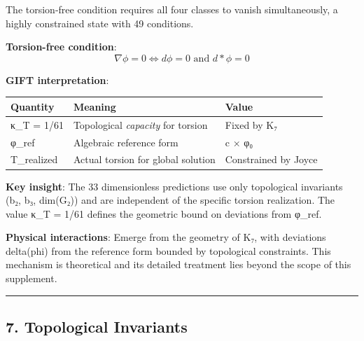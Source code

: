\documentclass[11pt,a4paper]{article}
\begin{document}
{{{{{{{{{{{{The torsion-free condition requires all four classes to vanish simultaneously, a highly constrained state with 49 conditions.

\textbf{Torsion-free condition}:
\[\nabla\phi = 0 \Leftrightarrow d\phi = 0 \text{ and } d*\phi = 0\]

\textbf{GIFT interpretation}:

{\def\LTcaptype{none} %
\begin{longtable}[]{@{}
  >{\raggedright\arraybackslash}p{}
  >{\raggedright\arraybackslash}p{}
  >{\raggedright\arraybackslash}p{}@{}}
\toprule\noalign{}
\begin{minipage}[b]{\linewidth}\raggedright
Quantity
\end{minipage} & \begin{minipage}[b]{\linewidth}\raggedright
Meaning
\end{minipage} & \begin{minipage}[b]{\linewidth}\raggedright
Value
\end{minipage} \\
\midrule\noalign{}
\endhead
\bottomrule\noalign{}
\endlastfoot
κ\_T = 1/61 & Topological \emph{capacity} for torsion & Fixed by K₇ \\
φ\_ref & Algebraic reference form & c × φ₀ \\
T\_realized & Actual torsion for global solution & Constrained by Joyce \\
\end{longtable}
\textbf{Key insight}: The 33 dimensionless predictions use only topological invariants (b₂, b₃, dim(G₂)) and are independent of the specific torsion realization. The value κ\_T = 1/61 defines the geometric bound on deviations from φ\_ref.

\textbf{Physical interactions}: Emerge from the geometry of K₇, with deviations delta(phi) from the reference form bounded by topological constraints. This mechanism is theoretical and its detailed treatment lies beyond the scope of this supplement.

\begin{center}\rule{0.5\linewidth}{0.5pt}\end{center}

\subsection{7. Topological Invariants}\label{topological-invariants}

}}}}}}}}}}}}}
\end{document}
